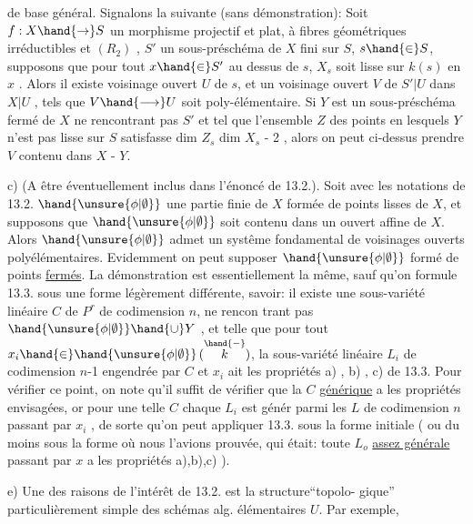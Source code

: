 
de base général. Signalons la suivante (sans démonstration): Soit $f:X\hand{\to} S$
un morphisme projectif et plat,  à fibres géométriques
 irréductibles et $(R_2)$ , $S'$ un sous-préschéma de $X$ fini sur $S$,
$s\hand{\in} S$, supposons que pour tout $x\hand{\in} S'$ au dessus de $s$, $X_s$ soit lisse sur
$k(s)$ en $x$ . Alors il existe  voisinage ouvert $U$ de $s$, et un voisinage
ouvert $V$ de $S'|U$ dans $X|U$ , tels que $V\hand{\longrightarrow} U$ soit poly-élémentaire.
Si $Y$ est un sous-préschéma fermé de $X$ ne rencontrant pas $S'$ et tel que l'ensemble $Z$ des points
en lesquels $Y$ n'est pas lisse sur $S$   satisfasse
dim $Z_s$ \hand{$\leq$} dim $X_s$ - 2 , alors on peut ci-dessus prendre $V$ contenu dans
$X$ - $Y$.

c) (A être éventuellement inclus dans l'énoncé de 13.2.). Soit
avec les notations de 13.2. $\hand{\unsure{\phi|\emptyset}}$ une partie finie de $X$ formée de points
lisses de $X$, et supposons que $\hand{\unsure{\phi|\emptyset}}$ soit contenu dans un  ouvert affine
de $X$. Alors $\hand{\unsure{\phi|\emptyset}}$ admet un systême fondamental de voisinages ouverts
polyélémentaires. Evidemment on peut supposer $\hand{\unsure{\phi|\emptyset}}$ formé de points \uline{fermés}. La démonstration est essentiellement la même, sauf
qu'on formule 13.3. sous une forme légèrement différente, savoir: il
existe une sous-variété linéaire $C$ de $P^r$ de codimension $n$, ne rencon%
trant pas $\hand{\unsure{\phi|\emptyset}}\hand{\cup} Y$ , et telle que pour tout $x_i\hand{\in}\hand{\unsure{\phi|\emptyset}}$$(\overset{\hand{-}}{k})$, la sous-variété
linéaire $L_i$ de codimension $n$-1 engendrée par $C$ et $x_i$ ait les propriétés
a) , b) , c) de 13.3. Pour vérifier ce point, on note qu'il suffit de
vérifier que la $C$ \uline{générique} a les propriétés envisagées, or pour une telle $C$ 
 chaque $L_i$ est génér parmi les $L$ de codimension $n$ passant
par $x_i$ , de sorte qu'on peut appliquer 13.3. sous la forme initiale
( ou du moins sous la forme où nous l'avions prouvée, qui était: toute
$L_o$ \uline{assez générale} passant par $x$ a les propriétés a),b),c) ).

e) Une des raisons de l'intérêt de 13.2. est la structure``topolo-%
gique'' particulièrement simple des  schémas alg. élémentaires $U$. Par exemple,


